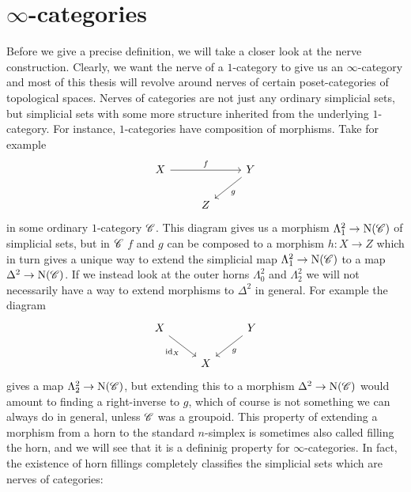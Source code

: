 \documentclass[../../thesis.tex]{subfiles}
\begin{document}
\section{$\infty$-categories}
Before we give a precise definition, we will take a closer look at the nerve construction.
Clearly, we want the nerve of a $1$-category to give us an $\infty$-category and most of this thesis will revolve around nerves of certain poset-categories of topological spaces.
Nerves of categories are not just any ordinary simplicial sets, but simplicial sets with some more structure inherited from the underlying $1$-category.
For instance, $1$-categories have composition of morphisms.
Take for example
\[\begin{tikzcd}
        X && Y \\
        & Z
        \arrow["f", from=1-1, to=1-3]
        \arrow["g", from=1-3, to=2-2]
    \end{tikzcd}\]
in some ordinary $1$-category $\mathscr{C}$.
This diagram gives us a morphism $\Lambda_1^2\to \mathrm{N}(\mathscr{C})$ of simplicial sets, but in $\mathscr{C}$ $f$ and $g$ can be composed to a morphism $h: X \to Z$ which in turn gives a unique way to extend the simplicial map $\Lambda_1^2\to \mathrm{N}(\mathscr{C})$ to a map $\Delta^2 \to \mathrm{N}(\mathscr{C})$.
If we instead look at the outer horns $\Lambda_0^2$ and $\Lambda_2^2$ we will not necessarily have a way to extend morphisms to $\Delta^2$ in general.
For example the diagram
\[\begin{tikzcd}
        X && Y \\
        & X
        \arrow["g", from=1-3, to=2-2]
        \arrow["\id_X"', from=1-1, to=2-2]
    \end{tikzcd}\]
gives a map $\Lambda_2^2\to \mathrm{N}(\mathscr{C})$, but extending this to a morphism $\Delta^2 \to \mathrm{N}(\mathscr{C})$ would amount to finding a right-inverse to $g$, which of course is not something we can always do in general, unless $\mathscr{C}$ was a groupoid.
This property of extending a morphism from a horn to the standard $n$-simplex is sometimes also called filling the horn, and we will see that it is a defininig property for $\infty$-categories.
In fact, the existence of horn fillings completely classifies the simplicial sets which are nerves of categories:
\end{document}
